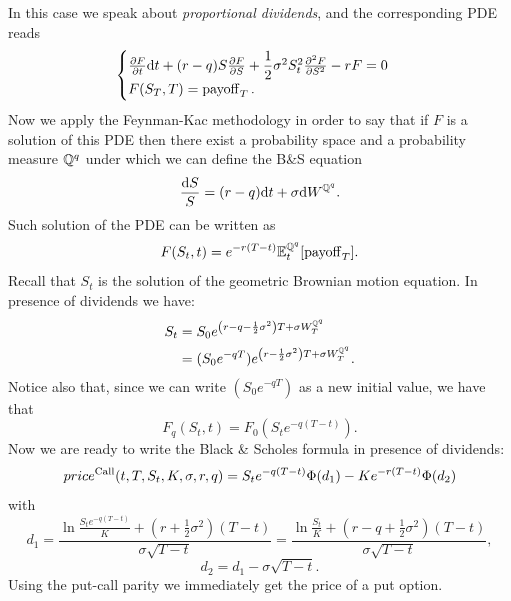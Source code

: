 In this case we speak about \emph{proportional dividends}, and the corresponding PDE reads
\begin{equation}
    \begin{cases}
    \pdv{F}{t}\dd t + (r-q)S\pdv{F}{S} + \dfrac{1}{2}\sigma^2S_t^2\pdv[2]{F}{S} - rF = 0 \\
    F(S_T,T) = \operatorname{payoff}_T.
    \end{cases}
\end{equation}
Now we apply the Feynman-Kac methodology in order to say that if $F$ is a solution of this PDE then there exist a probability space and a probability measure $\mathbb{Q}^q$ under which we can define the B\&S equation
\begin{equation}
    \dfrac{\dd S}{S} = (r-q)\dd t + \sigma \dd W^{\mathbb{Q}^q}.
\end{equation}
Such solution of the PDE can be written as
\begin{equation}
    F(S_t,t) = e^{-r(T-t)}\mathbb{E}^{\mathbb{Q}^q}_t[\operatorname{payoff}_T].
\end{equation}
Recall that $S_t$ is the solution of the geometric Brownian motion equation. In presence of dividends we have:
\begin{align}
    S_t &= S_0e^{\left(r-q-\frac{1}{2}\sigma^2\right)T+\sigma W_T^{\mathbb{Q}^q}} \\
    &=
    (S_0e^{-qT})e^{\left(r-\frac{1}{2}\sigma^2\right)T+\sigma W_T^{\mathbb{Q}^q}}.
\end{align}
Notice also that, since we can write $(S_0e^{-qT})$ as a new initial value, we have that
\begin{equation}
    F_q(S_t,t) = F_0(S_te^{-q( T-t)}).
\end{equation}
Now we are ready to write the Black \& Scholes formula in presence of dividends:
\begin{equation}
    price^{\operatorname{Call}}(t,T,S_t,K,\sigma,r,q) = S_te^{-q( T-t)}\Phi(d_1)-Ke^{-r(T-t)}\Phi(d_2)
\end{equation}
with
\begin{equation}
    d_1 = \dfrac{\ln\frac{S_te^{-q(T-t)}}{K}+\left(r+\frac{1}{2}\sigma^2\right)(T-t)}{\sigma\sqrt{T-t}} = \dfrac{\ln\frac{S_t}{K}+\left(r-q+\frac{1}{2}\sigma^2\right)(T-t)}{\sigma\sqrt{T-t}},
\end{equation}
\begin{equation}
    d_2 = d_1 - \sigma\sqrt{T-t}.
\end{equation}
Using the put-call parity we immediately get the price of a put option.
